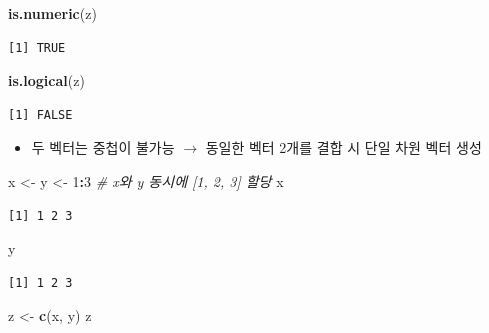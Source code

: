 \documentclass[
  11pt,
]{krantz}
\newenvironment{Shaded}{\begin{snugshade}}{\end{snugshade}}
\newcommand{\CommentTok}[1]{\textcolor[rgb]{0.37,0.37,0.37}{\textit{#1}}}
\newcommand{\DecValTok}[1]{\textcolor[rgb]{0.06,0.06,0.06}{#1}}
\newcommand{\KeywordTok}[1]{\textcolor[rgb]{0.27,0.27,0.27}{\textbf{#1}}}
\newcommand{\NormalTok}[1]{#1}
\newcommand{\OperatorTok}[1]{\textcolor[rgb]{0.43,0.43,0.43}{\textbf{#1}}}
\newcommand{\StringTok}[1]{\textcolor[rgb]{0.5,0.5,0.5}{#1}}
\providecommand{\tightlist}{%
  \setlength{\itemsep}{0pt}\setlength{\parskip}{0pt}}
\begin{document}
\begin{Shaded}
\begin{Highlighting}[]
\KeywordTok{is.numeric}\NormalTok{(z)}
\end{Highlighting}
\end{Shaded}

\begin{verbatim}
[1] TRUE
\end{verbatim}

\begin{Shaded}
\begin{Highlighting}[]
\KeywordTok{is.logical}\NormalTok{(z)}
\end{Highlighting}
\end{Shaded}

\begin{verbatim}
[1] FALSE
\end{verbatim}

\normalsize

\begin{itemize}
\tightlist
\item
  두 벡터는 중첩이 불가능 \(\rightarrow\) 동일한 벡터 2개를 결합 시 단일 차원 벡터 생성
\end{itemize}

\footnotesize

\begin{Shaded}
\begin{Highlighting}[]
\NormalTok{x <-}\StringTok{ }\NormalTok{y <-}\StringTok{ }\DecValTok{1}\OperatorTok{:}\DecValTok{3} \CommentTok{# x와 y 동시에 [1, 2, 3] 할당}
\NormalTok{x }
\end{Highlighting}
\end{Shaded}

\begin{verbatim}
[1] 1 2 3
\end{verbatim}

\begin{Shaded}
\begin{Highlighting}[]
\NormalTok{y}
\end{Highlighting}
\end{Shaded}

\begin{verbatim}
[1] 1 2 3
\end{verbatim}

\begin{Shaded}
\begin{Highlighting}[]
\NormalTok{z <-}\StringTok{ }\KeywordTok{c}\NormalTok{(x, y)}
\NormalTok{z}
\end{Highlighting}
\end{Shaded}
\end{document}
